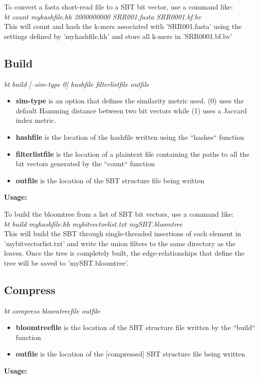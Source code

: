 \documentclass{article}
\begin{document}
To convert a fasta short-read file to a SBT bit vector, use a command like: \\

\textit{bt count myhashfile.hh 2000000000 SRR001.fasta SRR0001.bf.bv} \\

This will count and hash the k-mers associated with 'SRR001.fasta' using the settings defined by 'myhashfile.hh' and store all k-mers in 'SRR0001.bf.bv'

\subsection{Build}
\textit{bt build [--sim-type 0] hashfile filterlistfile outfile}
\begin{itemize}
\item \textbf{sim-type} is an option that defines the similarity metric used. (0) uses the default Hamming distance between two bit vectors while (1) uses a Jaccard index metric.
\item \textbf{hashfile} is the location of the hashfile written using the ``hashes`` function
\item \textbf{filterlistfile} is the location of a plaintext file containing the paths to all the bit vectors generated by the ``count`` function
\item \textbf{outfile} is the location of the SBT structure file being written
\end{itemize}
\textbf{Usage:}

To build the bloomtree from a list of SBT bit vectors, use a command like: \\

\textit{bt build myhashfile.hh mybitvectorlist.txt mySBT.bloomtree} \\

This will build the SBT through single-threaded insertions of each element in 'mybitvectorlist.txt' and write the union filters to the same directory as the leaves. Once the tree is completely built, the edge-relationships that define the tree will be saved to 'mySBT.bloomtree'.

\subsection{Compress}
\textit{bt compress bloomtreefile outfile}
\begin{itemize}
\item \textbf{bloomtreefile} is the location of the SBT structure file written by the ``build`` function
\item \textbf{outfile} is the location of the [compressed] SBT structure file being written
\end{itemize}
\textbf{Usage:}
\end{document}
